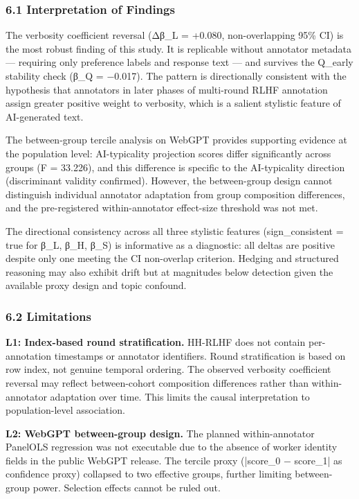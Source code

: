 
\subsubsection{6.1 Interpretation of Findings}

The verbosity coefficient reversal (Δβ_L = +0.080, non-overlapping 95\% CI) is the most robust finding of this study. It is replicable without annotator metadata — requiring only preference labels and response text — and survives the Q_early stability check (β_Q = −0.017). The pattern is directionally consistent with the hypothesis that annotators in later phases of multi-round RLHF annotation assign greater positive weight to verbosity, which is a salient stylistic feature of AI-generated text.

The between-group tercile analysis on WebGPT provides supporting evidence at the population level: AI-typicality projection scores differ significantly across groups (F = 33.226), and this difference is specific to the AI-typicality direction (discriminant validity confirmed). However, the between-group design cannot distinguish individual annotator adaptation from group composition differences, and the pre-registered within-annotator effect-size threshold was not met.

The directional consistency across all three stylistic features (sign_consistent = true for β_L, β_H, β_S) is informative as a diagnostic: all deltas are positive despite only one meeting the CI non-overlap criterion. Hedging and structured reasoning may also exhibit drift but at magnitudes below detection given the available proxy design and topic confound.

\subsubsection{6.2 Limitations}

\textbf{L1: Index-based round stratification.} HH-RLHF does not contain per-annotation timestamps or annotator identifiers. Round stratification is based on row index, not genuine temporal ordering. The observed verbosity coefficient reversal may reflect between-cohort composition differences rather than within-annotator adaptation over time. This limits the causal interpretation to population-level association.

\textbf{L2: WebGPT between-group design.} The planned within-annotator PanelOLS regression was not executable due to the absence of worker identity fields in the public WebGPT release. The tercile proxy (|score_0 − score_1| as confidence proxy) collapsed to two effective groups, further limiting between-group power. Selection effects cannot be ruled out.

